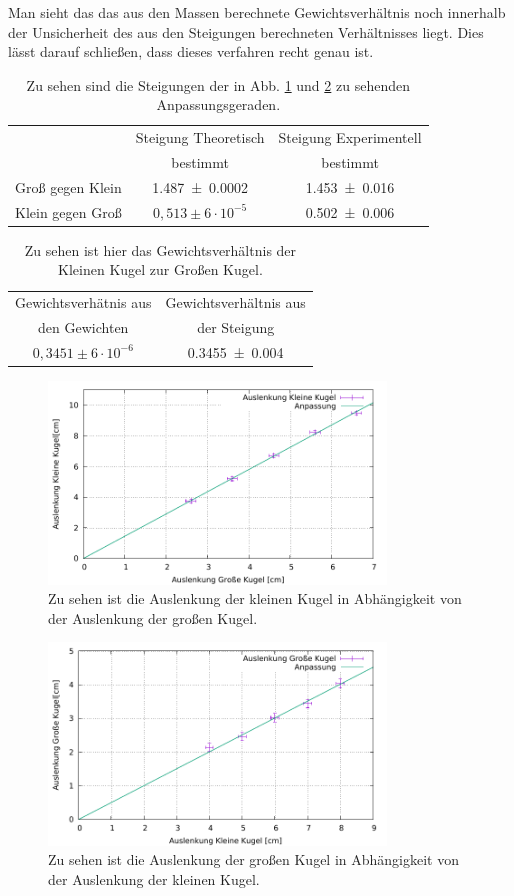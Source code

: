Man sieht das das aus den Massen berechnete Gewichtsverhältnis  noch innerhalb der Unsicherheit des aus den Steigungen berechneten Verhältnisses liegt. Dies lässt darauf schließen, dass dieses verfahren recht genau ist.
\begin{table}[h]
	\begin{tabular}{|c|c|c|}
		\hline
		& Steigung Theoretisch & Steigung Experimentell\\
		& bestimmt & bestimmt\\
		\hline
		Groß gegen Klein &  \SI{1,487+-0,0002}{} & \SI{1,453+-0,016}{} \\
		\hline
		Klein gegen Groß & $0,513 \pm 6 \cdot 10^{-5}$&\SI{0,502+-0,006}{}\\
		\hline
	\end{tabular}
\caption{Zu sehen sind die Steigungen der in Abb. \ref{fig:grosklein} und \ref{fig:kleingros} zu sehenden Anpassungsgeraden.}
\label{tab:steigung}
\end{table}
\begin{table}[h]
	\begin{tabular}{|c|c|}
		\hline
		Gewichtsverhätnis aus  & Gewichtsverhältnis aus\\
		 den Gewichten & der Steigung\\
		\hline
		$0,3451 \pm 6 \cdot 10^{-6}$& \SI{0,3455+-0,004}{}\\
		\hline
	\end{tabular}
	\caption{Zu sehen ist hier das Gewichtsverhältnis der Kleinen Kugel zur Großen Kugel.}
	\label{tab:Gewicht}
\end{table}
\begin{figure}[h]
	\centering
	\includegraphics[width=0.8\textwidth]{res/GrosKlein.pdf}
	\caption{Zu sehen ist die Auslenkung der kleinen Kugel in Abhängigkeit von der Auslenkung der großen Kugel.}
	\label{fig:grosklein}
\end{figure}
\begin{figure}[h]
	\centering
	\includegraphics[width=0.8\textwidth]{res/KleinGros.pdf}
	\caption{Zu sehen ist die Auslenkung der großen Kugel in Abhängigkeit von der Auslenkung der kleinen Kugel.}
	\label{fig:kleingros}
\end{figure}